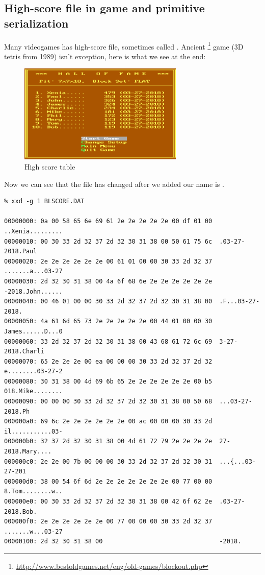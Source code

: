 \subsection{High-score file in  game and primitive serialization}

Many videogames has high-score file, sometimes called .
Ancient \footnote{\url{http://www.bestoldgames.net/eng/old-games/blockout.php}} game
(3D tetris from 1989) isn't exception, here is what we see at the end:

\begin{figure}[H]
\centering
\includegraphics[width=0.7\textwidth]{advanced/550_more_structs/blockout/hs.png}
\caption{High score table}
\end{figure}

Now we can see that the file has changed after we added our name is .
\begin{lstlisting}
% xxd -g 1 BLSCORE.DAT

00000000: 0a 00 58 65 6e 69 61 2e 2e 2e 2e 2e 00 df 01 00  ..Xenia.........
00000010: 00 30 33 2d 32 37 2d 32 30 31 38 00 50 61 75 6c  .03-27-2018.Paul
00000020: 2e 2e 2e 2e 2e 2e 00 61 01 00 00 30 33 2d 32 37  .......a...03-27
00000030: 2d 32 30 31 38 00 4a 6f 68 6e 2e 2e 2e 2e 2e 2e  -2018.John......
00000040: 00 46 01 00 00 30 33 2d 32 37 2d 32 30 31 38 00  .F...03-27-2018.
00000050: 4a 61 6d 65 73 2e 2e 2e 2e 2e 00 44 01 00 00 30  James......D...0
00000060: 33 2d 32 37 2d 32 30 31 38 00 43 68 61 72 6c 69  3-27-2018.Charli
00000070: 65 2e 2e 2e 00 ea 00 00 00 30 33 2d 32 37 2d 32  e........03-27-2
00000080: 30 31 38 00 4d 69 6b 65 2e 2e 2e 2e 2e 2e 00 b5  018.Mike........
00000090: 00 00 00 30 33 2d 32 37 2d 32 30 31 38 00 50 68  ...03-27-2018.Ph
000000a0: 69 6c 2e 2e 2e 2e 2e 2e 00 ac 00 00 00 30 33 2d  il...........03-
000000b0: 32 37 2d 32 30 31 38 00 4d 61 72 79 2e 2e 2e 2e  27-2018.Mary....
000000c0: 2e 2e 00 7b 00 00 00 30 33 2d 32 37 2d 32 30 31  ...{...03-27-201
000000d0: 38 00 54 6f 6d 2e 2e 2e 2e 2e 2e 2e 00 77 00 00  8.Tom........w..
000000e0: 00 30 33 2d 32 37 2d 32 30 31 38 00 42 6f 62 2e  .03-27-2018.Bob.
000000f0: 2e 2e 2e 2e 2e 2e 00 77 00 00 00 30 33 2d 32 37  .......w...03-27
00000100: 2d 32 30 31 38 00                                -2018.
\end{lstlisting}


